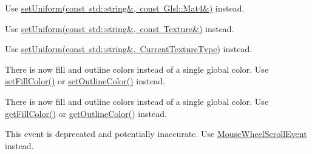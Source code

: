 \begin{DoxyRefList}
%
Use \mbox{\hyperlink{classsf_1_1_shader_aca5c55c4a3b23d21e33dbdaab7990755}{set\+Uniform(const std\+::string\&, const Glsl\+::\+Mat4\&)}} instead. 
\item[Member \mbox{\hyperlink{classsf_1_1_shader_a08c7cafd4f73ab898319c4fd7d8b5501}{sf\+::Shader\+::set\+Parameter}} (const std\+::string \&name, const \mbox{\hyperlink{classsf_1_1_texture}{Texture}} \&texture)]\label{deprecated__deprecated000014}%
%
Use \mbox{\hyperlink{classsf_1_1_shader_a7806a29ffbd0ee9251256a9e7265d479}{set\+Uniform(const std\+::string\&, const Texture\&)}} instead. 
\item[Member \mbox{\hyperlink{classsf_1_1_shader_a0fa7ecad14206e4d5edae1d6aa87f553}{sf\+::Shader\+::set\+Parameter}} (const std\+::string \&name, \mbox{\hyperlink{structsf_1_1_shader_1_1_current_texture_type}{Current\+Texture\+Type}})]\label{deprecated__deprecated000015}%
%
Use \mbox{\hyperlink{classsf_1_1_shader_ab18f531e1f726b88fec1cf5a1e6af26d}{set\+Uniform(const std\+::string\&, Current\+Texture\+Type)}} instead. 
\item[Member \mbox{\hyperlink{classsf_1_1_text_a6ce65272d6d63ed01118366e92c68132}{sf\+::Text\+::set\+Color}} (const \mbox{\hyperlink{classsf_1_1_color}{Color}} \&color)]\label{deprecated__deprecated000016}%
%
There is now fill and outline colors instead of a single global color. Use \mbox{\hyperlink{classsf_1_1_text_ab7bb3babac5a6da1802b2c3e1a3e6dcc}{set\+Fill\+Color()}} or \mbox{\hyperlink{classsf_1_1_text_aa19ec69c3b894e963602a6804ca68fe4}{set\+Outline\+Color()}} instead. 
\item[Member \mbox{\hyperlink{classsf_1_1_text_a77ba664285efd72ab4ce85b9cbbeeb21}{sf\+::Text\+::get\+Color}} () const]\label{deprecated__deprecated000017}%
%
There is now fill and outline colors instead of a single global color. Use \mbox{\hyperlink{classsf_1_1_text_a6b4ba8c435b59e1e05f831e6230dc537}{get\+Fill\+Color()}} or \mbox{\hyperlink{classsf_1_1_text_a53559d563461089f1172571b375442dc}{get\+Outline\+Color()}} instead. 
\item[Class \mbox{\hyperlink{structsf_1_1_event_1_1_mouse_wheel_event}{sf\+::Event\+::Mouse\+Wheel\+Event}} ]\label{deprecated__deprecated000018}%
%
This event is deprecated and potentially inaccurate. Use \mbox{\hyperlink{structsf_1_1_event_1_1_mouse_wheel_scroll_event}{Mouse\+Wheel\+Scroll\+Event}} instead. 

\end{DoxyRefList}
